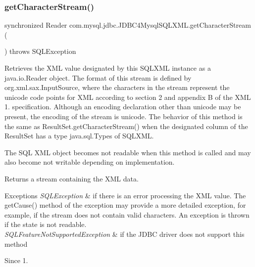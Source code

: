 \subsubsection{\texorpdfstring{get\+Character\+Stream()}{getCharacterStream()}}
{\footnotesize\ttfamily synchronized Reader com.\+mysql.\+jdbc.\+J\+D\+B\+C4\+Mysql\+S\+Q\+L\+X\+M\+L.\+get\+Character\+Stream (\begin{DoxyParamCaption}{ }\end{DoxyParamCaption}) throws S\+Q\+L\+Exception}

Retrieves the X\+ML value designated by this S\+Q\+L\+X\+ML instance as a java.\+io.\+Reader object. The format of this stream is defined by org.\+xml.\+sax.\+Input\+Source, where the characters in the stream represent the unicode code points for X\+ML according to section 2 and appendix B of the X\+ML 1. specification. Although an encoding declaration other than unicode may be present, the encoding of the stream is unicode. The behavior of this method is the same as Result\+Set.\+get\+Character\+Stream() when the designated column of the Result\+Set has a type java.\+sql.\+Types of S\+Q\+L\+X\+ML. 

The S\+QL X\+ML object becomes not readable when this method is called and may also become not writable depending on implementation.

\begin{DoxyReturn}{Returns}
a stream containing the X\+ML data. 
\end{DoxyReturn}

\begin{DoxyExceptions}{Exceptions}
{\em S\+Q\+L\+Exception} & if there is an error processing the X\+ML value. The get\+Cause() method of the exception may provide a more detailed exception, for example, if the stream does not contain valid characters. An exception is thrown if the state is not readable. \\
\hline
{\em S\+Q\+L\+Feature\+Not\+Supported\+Exception} & if the J\+D\+BC driver does not support this method \\
\hline
\end{DoxyExceptions}
\begin{DoxySince}{Since}
1. 
\end{DoxySince}
\mbox{\label{classcom_1_1mysql_1_1jdbc_1_1_j_d_b_c4_mysql_s_q_l_x_m_l_a8f48a3067f353a720f99b3dee481c522}} 
